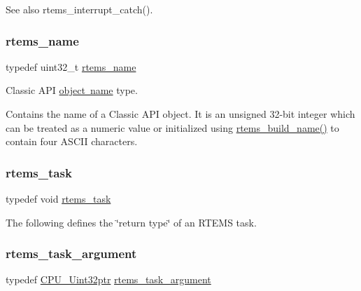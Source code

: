 \begin{DoxySeeAlso}{See also}
rtems\+\_\+interrupt\+\_\+catch(). 
\end{DoxySeeAlso}
\mbox{\label{group__ClassicTasks_ga55fb63c49f68c0cbd9bee004da15b1fd}} 
\subsubsection{\texorpdfstring{rtems\_name}{rtems\_name}}
{\footnotesize\ttfamily typedef uint32\+\_\+t \mbox{\hyperlink{group__ClassicTasks_ga55fb63c49f68c0cbd9bee004da15b1fd}{rtems\+\_\+name}}}



Classic A\+PI \mbox{\hyperlink{group__RTEMSAPIClassic_ClassicRTEMSSubSecObjectNames}{object name}} type. 

Contains the name of a Classic A\+PI object. It is an unsigned 32-\/bit integer which can be treated as a numeric value or initialized using \mbox{\hyperlink{group__ClassicClassInfo_ga3f71442fa9093ffaa102cde5dcbd7daf}{rtems\+\_\+build\+\_\+name()}} to contain four A\+S\+C\+II characters. \mbox{\label{group__ClassicTasks_gadf265d2ec26417f16d856514bd9d9394}} 
\subsubsection{\texorpdfstring{rtems\_task}{rtems\_task}}
{\footnotesize\ttfamily typedef void \mbox{\hyperlink{group__ClassicTasks_gadf265d2ec26417f16d856514bd9d9394}{rtems\+\_\+task}}}

The following defines the \char`\"{}return type\char`\"{} of an R\+T\+E\+MS task. \mbox{\label{group__ClassicTasks_gaf202f985ef5a3156f29eae99a0536842}} 
\subsubsection{\texorpdfstring{rtems\_task\_argument}{rtems\_task\_argument}}
{\footnotesize\ttfamily typedef \mbox{\hyperlink{group__RTEMSScoreCPUARM_ga9fca17f81f850e128fcc8ed5b87ff2ab}{C\+P\+U\+\_\+\+Uint32ptr}} \mbox{\hyperlink{group__ClassicTasks_gaf202f985ef5a3156f29eae99a0536842}{rtems\+\_\+task\+\_\+argument}}}

